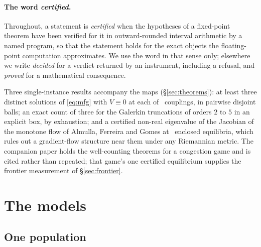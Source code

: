 \documentclass[11pt]{article}
\theoremstyle{definition}
\begin{document}
\paragraph{The word \emph{certified}.} Throughout, a statement is \emph{certified} when the hypotheses of a fixed-point theorem have been verified for it in outward-rounded interval arithmetic by a named program, so that the statement holds for the exact objects the floating-point computation approximates. We use the word in that sense only; elsewhere we write \emph{decided} for a verdict returned by an instrument, including a refusal, and \emph{proved} for a mathematical consequence.

Three single-instance results accompany the maps (\S\ref{sec:theorems}): at least three distinct solutions of \eqref{eq:mfg} with $V\equiv0$ at each of \MultCount\ couplings, in pairwise disjoint balls; an exact count of three for the Galerkin truncations of orders $2$ to $5$ in an explicit box, by exhaustion; and a certified non-real eigenvalue of the Jacobian of the monotone flow of Almulla, Ferreira and Gomes \cite{AFG17,FGT25} at \MonoDecided\ enclosed equilibria, which rules out a gradient-flow structure near them under any Riemannian metric. The companion paper \cite{TerraPeaks} holds the well-counting theorems for a congestion game and is cited rather than repeated; that game's one certified equilibrium \cite{CongestPage} supplies the frontier measurement of \S\ref{sec:frontier}.

\section{The models}\label{sec:models}

\subsection{One population}
\end{document}
